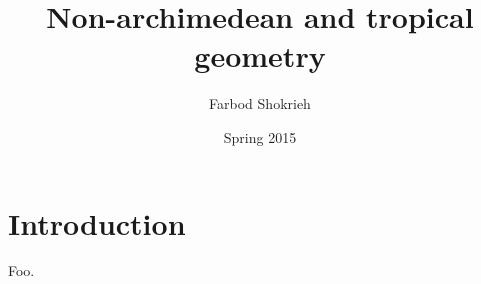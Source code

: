 \documentclass[oneside]{article}
\title{Non-archimedean and tropical geometry}
\author{Farbod Shokrieh}
\date{Spring 2015}
\begin{document}
\maketitle
\tableofcontents





\section{Introduction}

Foo. 
\end{document}

